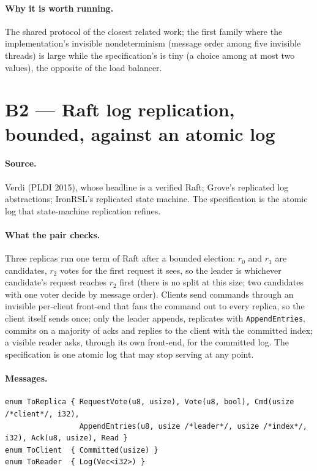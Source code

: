 \documentclass[11pt,a4paper]{article}
\newcommand{\code}[1]{\texttt{#1}}
\begin{document}
\paragraph{Why it is worth running.} The shared protocol of the closest related work; the
first family where the implementation's invisible nondeterminism (message order among five
invisible threads) is large while the specification's is tiny (a choice among at most two
values), the opposite of the load balancer.

\section{B2 --- Raft log replication, bounded, against an atomic log}

\paragraph{Source.} Verdi (PLDI 2015), whose headline is a verified Raft; Grove's replicated
log abstractions; IronRSL's replicated state machine. The specification is the atomic log that
state-machine replication refines.

\paragraph{What the pair checks.} Three replicas run one term of Raft after a bounded election:
$r_0$ and $r_1$ are candidates, $r_2$ votes for the first request it sees, so the leader is
whichever candidate's request reaches $r_2$ first (there is no split at this size; two
candidates with one voter decide by message order). Clients send commands through an invisible
per-client front-end that fans the command out to every replica, so the client itself sends once;
only the leader appends, replicates with \code{AppendEntries}, commits on a majority of acks and
replies to the client with the committed index; a visible reader asks, through its own front-end,
for the committed log. The specification is one atomic log that may stop serving at any point.

\paragraph{Messages.}
\begin{lstlisting}
enum ToReplica { RequestVote(u8, usize), Vote(u8, bool), Cmd(usize /*client*/, i32),
                 AppendEntries(u8, usize /*leader*/, usize /*index*/, i32), Ack(u8, usize), Read }
enum ToClient  { Committed(usize) }
enum ToReader  { Log(Vec<i32>) }
\end{lstlisting}
\end{document}
